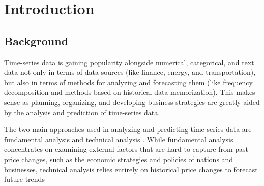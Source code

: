
\chapter{Introduction}
\label{chap:intro}

\section{Background}


Time-series data is gaining popularity alongside numerical, categorical, and text data not only in terms of data sources (like finance, energy, and transportation), but also in terms of methods for analyzing and forecasting them (like frequency decomposition and methods based on historical data memorization). This makes sense as planning, organizing, and developing business strategies are greatly aided by the analysis and prediction of time-series data.


The two main approaches used in analyzing and predicting time-series data are fundamental analysis and technical analysis \cite{ayitey2023forex}. While fundamental analysis concentrates on examining external factors that are hard to capture from past price changes, such as the economic strategies and policies of nations and businesses, technical analysis relies entirely on historical price changes to forecast future trends

